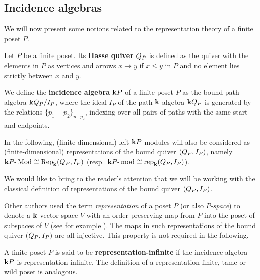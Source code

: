
\subsection{Incidence algebras}

We will now present some notions related to the representation theory of a finite poset $P$.

\begin{definition}\label{def:incidencealgebra}
	Let $P$ be a finite poset. Its \textbf{Hasse quiver} $Q_{P}$ is defined as the quiver with the elements in $P$ as vertices and arrows $x\rightarrow y$ if $x\leq y$ in $P$ and no element lies strictly between $x$ and $y$.
	
	We define the \textbf{incidence algebra} $\mathbf{k}{P}$ of a finite poset $P$ as the bound path algebra $\mathbf{k} Q_{P} / I_P$, where the ideal $I_P$ of the path $\mathbf{k}$-algebra $\mathbf{k} Q_{P}$ is generated by the relations $\{p_1-p_2\}_{p_1,p_2}$, indexing over all pairs of paths with the same start and endpoints.
\end{definition}

 In the following, (finite-dimensional) left $\mathbf{k}{P}$-modules will also be considered as (finite-dimensional) representations of the bound quiver $(Q_{P}, I_P)$, namely $\mathbf{k}{P}\text{-}\operatorname{Mod}\cong \operatorname{Rep}_{\mathbf{k}}(Q_{P}, I_P)$ (resp.~$\mathbf{k}{P}\text{-}\operatorname{mod}\cong \operatorname{rep}_{\mathbf{k}}(Q_{P}, I_P)$).

\begin{remark}
	We would like to bring to the reader's attention that we will be working with the classical definition of representations of the bound quiver $(Q_{P}, I_P)$.
	
	Other authors used the term \emph{representation} of a poset $P$ (or also \emph{$P$-space}) to denote a $\mathbf{k}$-vector space $V$ with an order-preserving map from $P$ into the poset of subspaces of $V$ (see for example \cite{nazarovaroiter:representations, gabriel:representations}). The maps in such representations of the bound quiver $(Q_{P},I_P)$ are all injective. This property is not required in the following.
\end{remark}

\begin{definition}
	A finite poset $P$ is said to be \textbf{representation-infinite} if the incidence algebra $\mathbf{k}{P}$ is representation-infinite. The definition of a representation-finite, tame or wild poset is analogous.
\end{definition}


